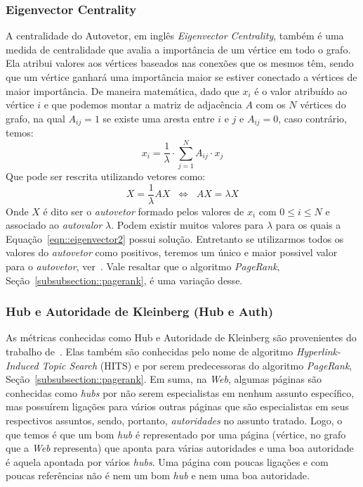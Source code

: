 \subsubsection{Eigenvector Centrality}
\label{subsubsection::eigenvector}
A centralidade do Autovetor, em inglês \textit{Eigenvector Centrality}, também é uma medida de centralidade que avalia a importância de um vértice em todo o grafo. Ela atribui valores aos vértices baseados nas conexões que os mesmos têm, sendo que um vértice ganhará uma importância maior se estiver conectado a vértices de maior importância. De maneira matemática, dado que $x_i$ é o valor atribuído ao vértice $i$ e que podemos montar a matriz de adjacência $A$ com os $N$ vértices do grafo, na qual $A_{ij} = 1$ se existe uma aresta entre $i$ e $j$ e $A_{ij}=0$, caso contrário, temos:
\begin{equation}\label{eqn::eigenvector1}
   x_i = \frac{1}{\lambda} \cdot \sum\limits_{j=1}^{N} A_{ij} \cdot x_j
\end{equation}
Que pode ser rescrita utilizando vetores como:
\begin{equation}\label{eqn::eigenvector2}
   X = \frac{1}{\lambda} AX  \;\; \Longleftrightarrow\;\;  AX = \lambda X
\end{equation}
Onde $X$ é dito ser o \textit{autovetor} formado pelos valores de $x_i$ com $0 \leq i \leq N$ e associado ao \textit{autovalor} $\lambda$.  Podem existir muitos valores para $\lambda$ para os quais a Equação~\ref{eqn::eigenvector2} possui solução. Entretanto se utilizarmos todos os valores do \textit{autovetor} como positivos, teremos um único e maior possivel valor para o \textit{autovetor}, ver~\cite{Newman10}. Vale resaltar que o algoritmo \textit{PageRank}, Seção~\ref{subsubsection::pagerank}, é uma variação desse.


\subsubsection{Hub e Autoridade de Kleinberg (Hub e Auth)}
\label{subsubsection::hub}
As métricas conhecidas como Hub e Autoridade de Kleinberg são provenientes do trabalho de~\cite{Kleinberg99}. Elas também são conhecidas pelo nome de algoritmo \textit{Hyperlink-Induced Topic Search} (HITS) e por serem predecessoras do algoritmo \textit{PageRank}, Seção~\ref{subsubsection::pagerank}. Em suma, na \textit{Web}, algumas páginas são conhecidas como \textit{hubs} por não serem especialistas em nenhum assunto específico, mas possuírem ligações para vários outras páginas que são especialistas em seus respectivos assuntos, sendo, portanto, \textit{autoridades} no assunto tratado. Logo, o que temos é que um bom \textit{hub} é representado por uma página (vértice, no grafo que a \textit{Web} representa) que aponta para várias autoridades e uma boa autoridade é aquela apontada por vários \textit{hubs}. Uma página com poucas ligações e com poucas referências não é nem um bom \textit{hub} e nem uma boa autoridade.

